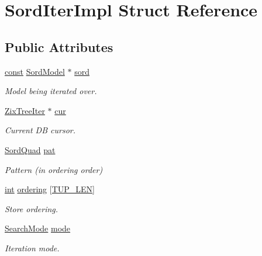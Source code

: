 \hypertarget{struct_sord_iter_impl}{}\section{Sord\+Iter\+Impl Struct Reference}
\label{struct_sord_iter_impl}
\subsection*{Public Attributes}
\begin{DoxyCompactItemize}
\item 
\hyperlink{getopt1_8c_a2c212835823e3c54a8ab6d95c652660e}{const} \hyperlink{group__sord_gaea018cfebfedd10280b1d8dd6d650a28}{Sord\+Model} $\ast$ \hyperlink{struct_sord_iter_impl_a6e78f08c329ec472f7a33c14cb627609}{sord}
\begin{DoxyCompactList}\small\item\em Model being iterated over. \end{DoxyCompactList}\item 
\hyperlink{group__zix_gad5034843cec6bf6ebbdc5b5fda7b112e}{Zix\+Tree\+Iter} $\ast$ \hyperlink{struct_sord_iter_impl_a20e44d81d729fb567bd0660829261f94}{cur}
\begin{DoxyCompactList}\small\item\em Current DB cursor. \end{DoxyCompactList}\item 
\hyperlink{group__sord_gac79773a042527877d00158c75a41bab2}{Sord\+Quad} \hyperlink{struct_sord_iter_impl_ac421d0325ee1c14cbe9eb3459e232c79}{pat}
\begin{DoxyCompactList}\small\item\em Pattern (in ordering order) \end{DoxyCompactList}\item 
\hyperlink{xmltok_8h_a5a0d4a5641ce434f1d23533f2b2e6653}{int} \hyperlink{struct_sord_iter_impl_a289a91ce551c37a315ace3a69b4218a5}{ordering} \mbox{[}\hyperlink{sord_8c_abf2b9ab4f1ef77e2813701e8679e48c2}{T\+U\+P\+\_\+\+L\+EN}\mbox{]}
\begin{DoxyCompactList}\small\item\em Store ordering. \end{DoxyCompactList}\item 
\hyperlink{sord_8c_a5a2afa1489549bc706d12bc66c0c4e72}{Search\+Mode} \hyperlink{struct_sord_iter_impl_a857921dd49f48ae2471dc39a5573fbff}{mode}
\begin{DoxyCompactList}\small\item\em Iteration mode. \end{DoxyCompactList}\item 

\end{DoxyCompactItemize}
